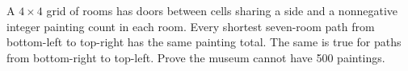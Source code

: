 A $4\times4$ grid of rooms has doors between cells sharing a side and a nonnegative integer painting count in each room. Every shortest seven-room path from bottom-left to top-right has the same painting total. The same is true for paths from bottom-right to top-left. Prove the museum cannot have 500 paintings.

